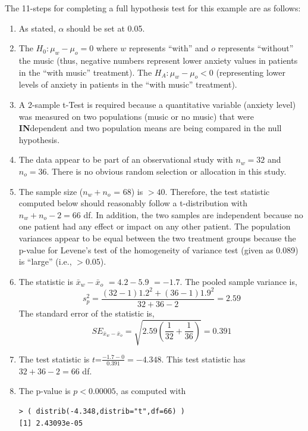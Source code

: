\documentclass[10pt,openany]{book}\usepackage[]{graphicx}\usepackage[]{color}
\makeatletter
\newenvironment{kframe}{%
 \def\at@end@of@kframe{}%
 \ifinner\ifhmode%
  \def\at@end@of@kframe{\end{minipage}}%
  \begin{minipage}{\columnwidth}%
 \fi\fi%
 \def\FrameCommand##1{\hskip\@totalleftmargin \hskip-\fboxsep
 \colorbox{shadecolor}{##1}\hskip-\fboxsep
     \hskip-\linewidth \hskip-\@totalleftmargin \hskip\columnwidth}%
 \MakeFramed {\advance\hsize-\width
   \@totalleftmargin\z@ \linewidth\hsize
   \@setminipage}}%
 {\par\unskip\endMakeFramed%
 \at@end@of@kframe}
\newenvironment{knitrout}{}{} %
\makeatother
\begin{document}
The 11-steps  for completing a full hypothesis test for this example are as follows:
  \begin{enumerate}
    \item As stated, $\alpha$ should be set at 0.05.
    \item The $H_{0}:\mu_{w}-\mu_{o}=0$ where $w$ represents ``with'' and $o$ represents ``without'' the music (thus, negative numbers represent lower anxiety values in patients in the ``with music'' treatment).  The $H_{A}:\mu_{w}-\mu_{o}<0$ (representing lower levels of anxiety in patients in the ``with music'' treatment).
    \item A 2-sample t-Test is required because a quantitative variable (anxiety level) was measured on two populations (music or no music) that were \textbf{IN}dependent and two population means are being compared in the null hypothesis.
    \item The data appear to be part of an observational study with $n_{w}=32$ and $n_{o}=36$.  There is no obvious random selection or allocation in this study.
    \item The sample size ($n_{w}+n_{o}$ = 68) is $>40$.  Therefore, the test statistic computed below should reasonably follow a t-distribution with $n_{w}+n_{o}-2=66$ df.  In addition, the two samples are independent because no one patient had any effect or impact on any other patient.  The population variances appear to be equal between the two treatment groups because the p-value for Levene's test of the homogeneity of variance test (given as 0.089) is ``large'' (i.e., $>0.05$).
    \item The statistic is $\bar{x}_{w}-\bar{x}_{o}$ $= 4.2-5.9$ $= -1.7$.  The pooled sample variance is,
    \[s_{p}^{2}=\frac{(32-1)1.2^{2}+(36-1)1.9^{2}}{32+36-2} = 2.59 \]
The standard error of the statistic is,
    \[ SE_{\bar{x}_{w}-\bar{x}_{o}}=\sqrt{2.59\left(\frac{1}{32}+\frac{1}{36} \right)} = 0.391  \]
    \item The test statistic is $t$=$\frac{-1.7-0}{0.391} = -4.348$.  This test statistic has $32+36-2=66$ df.
    \item The p-value is $p<0.00005$, as computed with
\begin{knitrout}
\color{fgcolor}\begin{kframe}
\begin{verbatim}
> ( distrib(-4.348,distrib="t",df=66) )
[1] 2.43093e-05
\end{verbatim}
\end{kframe}

\end{knitrout}
\end{enumerate}
\end{document}

